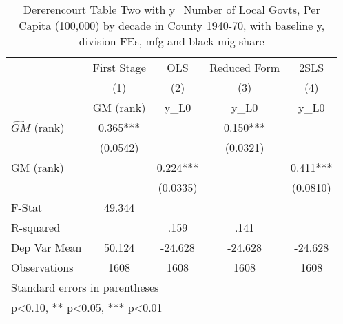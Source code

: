 \begin{table}[htbp]\centering
\def\sym#1{\ifmmode^{#1}\else\(^{#1}\)\fi}
\caption{Dererencourt Table Two with y=Number of Local Govts, Per Capita (100,000) by decade in County 1940-70, with baseline y, division FEs, mfg and black mig share}
\begin{tabular}{l*{4}{c}}
\toprule
                    & First Stage   &         OLS   &Reduced Form   &        2SLS   \\
                    &\multicolumn{1}{c}{(1)}&\multicolumn{1}{c}{(2)}&\multicolumn{1}{c}{(3)}&\multicolumn{1}{c}{(4)}\\
                    &\multicolumn{1}{c}{GM  (rank)}&\multicolumn{1}{c}{y\_L0}&\multicolumn{1}{c}{y\_L0}&\multicolumn{1}{c}{y\_L0}\\
\midrule
$\hat{GM}$ (rank)   &       0.365***&               &       0.150***&               \\
                    &    (0.0542)   &               &    (0.0321)   &               \\
\addlinespace
GM  (rank)          &               &       0.224***&               &       0.411***\\
                    &               &    (0.0335)   &               &    (0.0810)   \\
\midrule
F-Stat              &      49.344   &               &               &               \\
R-squared           &               &        .159   &        .141   &               \\
Dep Var Mean        &      50.124   &     -24.628   &     -24.628   &     -24.628   \\
Observations        &        1608   &        1608   &        1608   &        1608   \\
\bottomrule
\multicolumn{5}{l}{\footnotesize Standard errors in parentheses}\\
\multicolumn{5}{l}{\footnotesize * p<0.10, ** p<0.05, *** p<0.01}\\
\end{tabular}
\end{table}
